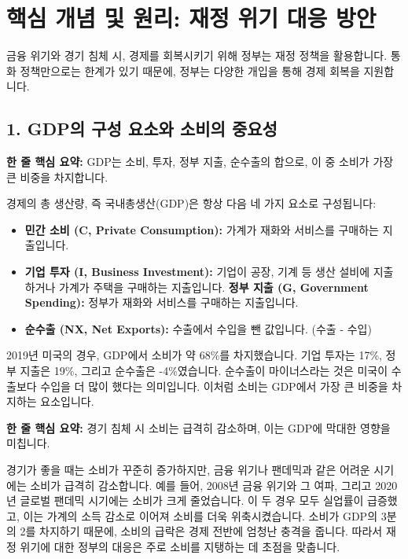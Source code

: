 \documentclass[11pt,a4paper]{book}
\theoremstyle{definition}
\begin{document}
\section{핵심 개념 및 원리: 재정 위기 대응 방안}

금융 위기와 경기 침체 시, 경제를 회복시키기 위해 정부는 재정 정책을 활용합니다. 통화 정책만으로는 한계가 있기 때문에, 정부는 다양한 개입을 통해 경제 회복을 지원합니다.

\subsection{1. GDP의 구성 요소와 소비의 중요성}

\begin{tcolorbox}[mybox={GDP의 구성 요소}]
    \textbf{한 줄 핵심 요약:} GDP는 소비, 투자, 정부 지출, 순수출의 합으로, 이 중 소비가 가장 큰 비중을 차지합니다.
\end{tcolorbox}

경제의 총 생산량, 즉 국내총생산(GDP)은 항상 다음 네 가지 요소로 구성됩니다:
\begin{itemize}
    \item \textbf{민간 소비 (C, Private Consumption):} 가계가 재화와 서비스를 구매하는 지출입니다.
    \item \textbf{기업 투자 (I, Business Investment):} 기업이 공장, 기계 등 생산 설비에 지출하거나 가계가 주택을 구매하는 지출입니다.
    \textbf{정부 지출 (G, Government Spending):} 정부가 재화와 서비스를 구매하는 지출입니다.
    \item \textbf{순수출 (NX, Net Exports):} 수출에서 수입을 뺀 값입니다. (수출 - 수입)
\end{itemize}

\begin{examplebox}[title={예시: 2019년 미국 GDP 구성}]
    2019년 미국의 경우, GDP에서 소비가 약 68\%를 차지했습니다. 기업 투자는 17\%, 정부 지출은 19\%, 그리고 순수출은 -4\%였습니다. 순수출이 마이너스라는 것은 미국이 수출보다 수입을 더 많이 했다는 의미입니다. 이처럼 소비는 GDP에서 가장 큰 비중을 차지하는 요소입니다.
\end{examplebox}

\begin{tcolorbox}[mybox={경기 침체 시 소비의 변화}]
    \textbf{한 줄 핵심 요약:} 경기 침체 시 소비는 급격히 감소하며, 이는 GDP에 막대한 영향을 미칩니다.
\end{tcolorbox}

경기가 좋을 때는 소비가 꾸준히 증가하지만, 금융 위기나 팬데믹과 같은 어려운 시기에는 소비가 급격히 감소합니다. 예를 들어, 2008년 금융 위기와 그 여파, 그리고 2020년 글로벌 팬데믹 시기에는 소비가 크게 줄었습니다. 이 두 경우 모두 실업률이 급증했고, 이는 가계의 소득 감소로 이어져 소비를 더욱 위축시켰습니다. 소비가 GDP의 3분의 2를 차지하기 때문에, 소비의 급락은 경제 전반에 엄청난 충격을 줍니다. 따라서 재정 위기에 대한 정부의 대응은 주로 소비를 지탱하는 데 초점을 맞춥니다.
\end{document}

